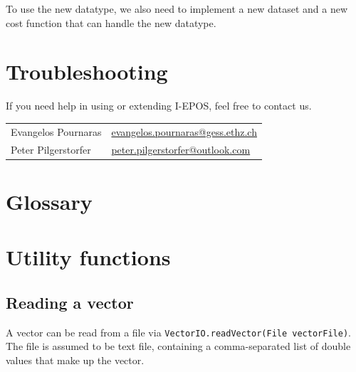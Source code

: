 \documentclass[11pt]{article} %
\newcommand{\code}{\texttt}
\begin{document}
To use the new datatype, we also need to implement a new dataset and a new cost function that can handle the new datatype.

\section{Troubleshooting}
If you need help in using or extending I-EPOS, feel free to contact us.

\begin{tabular}{ll}
Evangelos Pournaras & \url{evangelos.pournaras@gess.ethz.ch} \\
Peter Pilgerstorfer & \url{peter.pilgerstorfer@outlook.com}
\end{tabular}

\appendix
\section{Glossary}
\section{Utility functions}
\subsection{Reading a vector} \label{sec:read_vec}
A vector can be read from a file via \code{VectorIO.readVector(File vectorFile)}. The file is assumed to be text file, containing a comma-separated list of double values that make up the vector.
\end{document}
